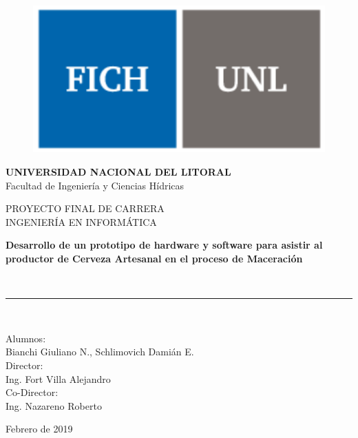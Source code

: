 \begin{titlepage}
	\cleardoublepage
	\frontmatter
	\begin{center}
		\begin{figure}
			\centerline{\includegraphics[scale=0.75]{fichunl.pdf}}
			\label{logo}
		\end{figure}
		\begin{Large}
			\textbf{UNIVERSIDAD NACIONAL DEL LITORAL} \\
			Facultad de Ingeniería y Ciencias Hídricas\\
			\vspace*{1cm}
		\end{Large}
		\vspace*{0.5cm}
		PROYECTO FINAL DE CARRERA\\
		INGENIERÍA EN INFORMÁTICA\\
		\vspace*{1.5cm}
		\begin{Large}
			\textbf{Desarrollo de un prototipo de hardware y software para asistir al productor de Cerveza Artesanal en el proceso de Maceración}
		\end{Large}
		\\
		\vspace*{1cm}
		\rule{100mm}{0.1mm}\\
		\vspace*{1.5cm}
		\begin{large}
			Alumnos: \\
			Bianchi Giuliano N., Schlimovich Damián E.\\
			\vspace*{0.5cm}
			Director: \\
			Ing. Fort Villa Alejandro   \\
			\vspace*{0.5cm}
			Co-Director: \\
			Ing. Nazareno Roberto\\
		\end{large}
		\vspace*{2.5cm}
		\begin{center}
			Febrero de 2019\textsl{}
		\end{center}
	\end{center}
\end{titlepage}